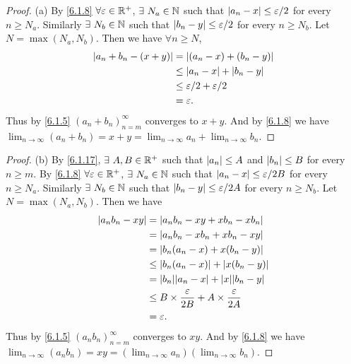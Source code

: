 \begin{proof}{(a)}
  By \cref{6.1.8} \(\forall \varepsilon \in \mathbb{R}^+\), \(\exists\ N_a \in \mathbb{N}\) such that \(\left\lvert a_n - x\right\rvert \leq \varepsilon / 2\) for every \(n \geq N_a\).
  Similarly \(\exists\ N_b \in \mathbb{N}\) such that \(\left\lvert b_n - y\right\rvert \leq \varepsilon / 2\) for every \(n \geq N_b\).
  Let \(N = \max(N_a, N_b)\).
  Then we have \(\forall n \geq N\),
  \begin{align*}
    \left\lvert a_n + b_n - (x + y)\right\rvert & = \left\lvert(a_n - x) + (b_n - y)\right\rvert          \\
                              & \leq \left\lvert a_n - x\right\rvert + \left\lvert b_n - y\right\rvert     \\
                              & \leq \varepsilon / 2 + \varepsilon / 2 \\
                              & = \varepsilon.
  \end{align*}
  Thus by \cref{6.1.5} \((a_n + b_n)_{n = m}^\infty\) converges to \(x + y\).
  And by \cref{6.1.8} we have \(\lim_{n \to \infty} (a_n + b_n) = x + y = \lim_{n \to \infty} a_n + \lim_{n \to \infty} b_n\).
\end{proof}

\begin{proof}{(b)}
  By \cref{6.1.17}, \(\exists\ A, B \in \mathbb{R}^+\) such that \(\left\lvert a_n\right\rvert \leq A\) and \(\left\lvert b_n\right\rvert \leq B\) for every \(n \geq m\).
  By \cref{6.1.8} \(\forall \varepsilon \in \mathbb{R}^+\), \(\exists\ N_a \in \mathbb{N}\) such that \(\left\lvert a_n - x\right\rvert \leq \varepsilon / 2B\) for every \(n \geq N_a\).
  Similarly \(\exists\ N_b \in \mathbb{N}\) such that \(\left\lvert b_n - y\right\rvert \leq \varepsilon / 2A\) for every \(n \geq N_b\).
  Let \(N = \max(N_a, N_b)\).
  Then we have
  \begin{align*}
    \abs{a_n b_n - x y} & = \abs{a_n b_n - x y + x b_n - x b_n}                                    \\
                        & = \abs{a_n b_n - x b_n + x b_n - x y}                                    \\
                        & = \abs{b_n(a_n - x) + x(b_n - y)}                                        \\
                        & \leq \abs{b_n(a_n - x)} + \abs{x(b_n - y)}                               \\
                        & = \abs{b_n}\abs{a_n - x} + \abs{x}\abs{b_n - y}                          \\
                        & \leq B \times \dfrac{\varepsilon}{2B} + A \times \dfrac{\varepsilon}{2A} \\
                        & = \varepsilon.
  \end{align*}
  Thus by \cref{6.1.5} \((a_n b_n)_{n = m}^\infty\) converges to \(x y\).
  And by \cref{6.1.8} we have \(\lim_{n \to \infty} (a_n b_n) = x y = (\lim_{n \to \infty} a_n)(\lim_{n \to \infty} b_n)\).
\end{proof}

